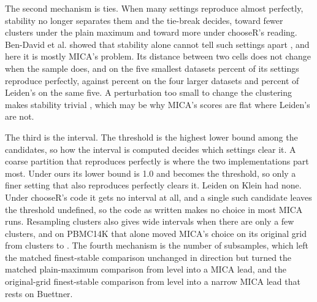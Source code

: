 The second mechanism is ties. When many settings reproduce almost perfectly, stability no longer
separates them and the tie-break decides, toward fewer clusters under the plain maximum and toward more
under chooseR's reading. Ben-David et al. showed that stability alone cannot tell such settings apart
\cite{BenDavid2006Sober}, and here it is mostly MICA's problem. Its distance between two cells does not
change when the sample does, and on the five smallest datasets  percent of its settings
reproduce perfectly, against  percent on the four larger datasets and
 percent of Leiden's on the same five. A perturbation too small to change the clustering makes
stability trivial \cite{vonLuxburg2010Stability}, which may be why MICA's scores are flat where Leiden's are
not.

The third is the interval. The threshold is the highest lower bound among the candidates, so how the
interval is computed decides which settings clear it. A coarse partition that reproduces perfectly is
where the two implementations part most. Under ours its lower bound is 1.0 and becomes the threshold, so
only a finer setting that also reproduces perfectly clears it. Leiden on Klein had none. Under chooseR's
code it gets no interval at all, and a single such candidate leaves the threshold undefined, so the code
as written makes no choice in most MICA runs. Resampling clusters also gives wide intervals when there
are only a few clusters, and on PBMC14K that alone moved MICA's choice on its original grid from
 clusters to . The fourth mechanism is the
number of subsamples, which left the matched finest-stable comparison unchanged in direction but turned
the matched plain-maximum comparison from level into a MICA lead, and the original-grid finest-stable
comparison from level into a narrow MICA lead that rests on Buettner.



